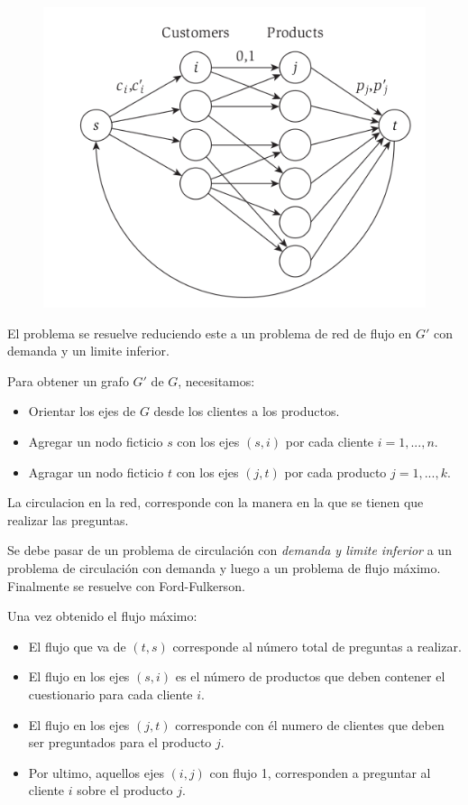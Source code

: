 \documentclass{article}
\begin{document}
\begin{figure}[h!]
    \includegraphics[width=\linewidth]{imagenes/grafo-encuesta.png}
\end{figure}

El problema se resuelve reduciendo este a un problema de red de flujo en \(G'\) con demanda y un limite inferior. 

Para obtener un grafo \(G'\) de \(G\), necesitamos:
\begin{itemize}
    \item Orientar los ejes de \(G\) desde los clientes a los productos.
    \item Agregar un nodo ficticio \(s\) con los ejes \((s,i)\) por cada cliente \(i=1,...,n\).
    \item Agragar un nodo ficticio \(t\) con los ejes \((j,t)\) por cada producto \(j=1,...,k\).
\end{itemize}

La circulacion en la red, corresponde con la manera en la que se tienen que realizar las preguntas.

Se debe pasar de un problema de circulación con \textit{demanda y limite inferior} a un problema
de circulación con demanda y luego a un problema de flujo máximo. Finalmente se resuelve con Ford-Fulkerson.

Una vez obtenido el flujo máximo:

\begin{itemize}
    \item El flujo que va de \((t,s)\) corresponde al número total de preguntas a realizar.
    \item El flujo en los ejes \((s,i)\) es el número de productos que deben contener el cuestionario para cada cliente \(i\).
    \item El flujo en los ejes \((j,t)\) corresponde con él numero de clientes que deben ser preguntados para el producto \(j\).
    \item Por ultimo, aquellos ejes \((i,j)\) con flujo 1, corresponden a preguntar al cliente \(i\) sobre el producto \(j\).
\end{itemize}
\end{document}

